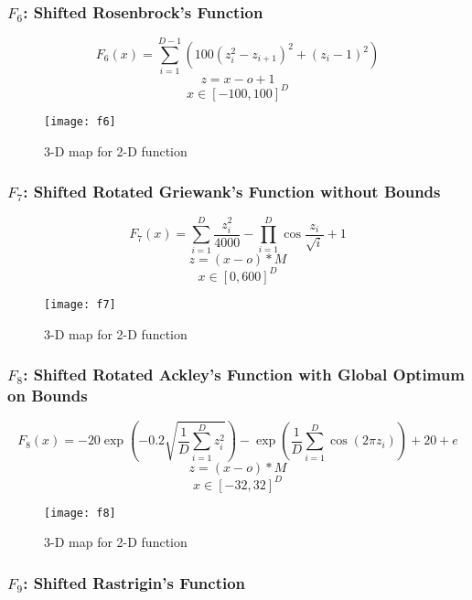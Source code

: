 \subsubsection{$F_6$: Shifted Rosenbrock’s Function}

\begin{equation}
  F_6(x)=\sum_{i=1}^{D-1}{(100(z_i^2 - z_{i+1})^2 + (z_i - 1)^2)}
\end{equation}
\[ z=x-o+1 \]
\[ x \in [-100,100]^D \]

\begin{figure}[H]
  \centering
  \texttt{[image: f6]}
  \caption{3-D map for 2-D function}
  \label{f6}
\end{figure}

\subsubsection{$F_7$: Shifted Rotated Griewank’s Function without Bounds}

\begin{equation}
  F_7(x)=\sum_{i=1}^{D}{\frac{z_i^2}{4000}}-\prod_{i=1}^{D}{\cos{\frac{z_i}{\sqrt{i}}}}+1
\end{equation}
\[ z=(x-o)*M \]
\[ x \in [0,600]^D \]

\begin{figure}[H]
  \centering
  \texttt{[image: f7]}
  \caption{3-D map for 2-D function}
  \label{f7}
\end{figure}

\subsubsection{$F_8$: Shifted Rotated Ackley’s Function with Global Optimum on Bounds}

\begin{equation}
  F_8(x)=-20\exp{(-0.2\sqrt{\frac{1}{D}\sum_{i=1}^{D}{z_i^2}})}-\exp{(\frac{1}{D}\sum_{i=1}^{D}{\cos{(2\pi z_i)}})} + 20 + e
\end{equation}
\[ z=(x-o)*M \]
\[ x \in [-32,32]^D \]

\begin{figure}[H]
  \centering
  \texttt{[image: f8]}
  \caption{3-D map for 2-D function}
  \label{f8}
\end{figure}

\subsubsection{$F_9$: Shifted Rastrigin’s Function}

